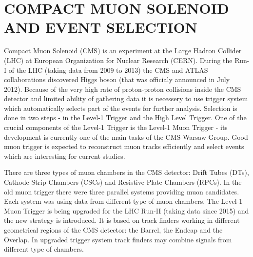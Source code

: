 \section{COMPACT MUON SOLENOID AND EVENT SELECTION}
\label{sec:1_CMS}
Compact Muon Solenoid (CMS) is an experiment at the Large Hadron Collider (LHC) at European Organization for Nuclear Research (CERN). During the Run-I of the LHC (taking data from 2009 to 2013) the CMS and ATLAS collaborations discovered Higgs boson (that was officialy announced in July 2012). Because of the very high rate of proton-proton collisions inside the CMS detector and limited ability of gathering data it is necessery to use trigger system which automatically selects part of the events for further analysis. Selection is done in two steps - in the Level-1 Trigger and the High Level Trigger. One of the crucial components of the Level-1 Trigger is the Level-1 Muon Trigger - its development is currently one of the main tasks of the CMS Warsaw Group. Good muon trigger is expected to reconstruct muon tracks efficiently and select events which are interesting for current studies. 

There are three types of muon chambers in the CMS detector: Drift Tubes (DTs), Cathode Strip Chambers (CSCs) and Resistive Plate Chambers (RPCs). In the old muon trigger there were three parallel systems providing muon candidates. Each system was using data from different type of muon chambers. The Level-1 Muon Trigger is being upgraded for the LHC Run-II (taking data since 2015) and the new strategy is introduced. It is based on track finders working in different geometrical regions of the CMS detector: the Barrel, the Endcap and the Overlap. In upgraded trigger system track finders may combine signals from different type of chambers.


